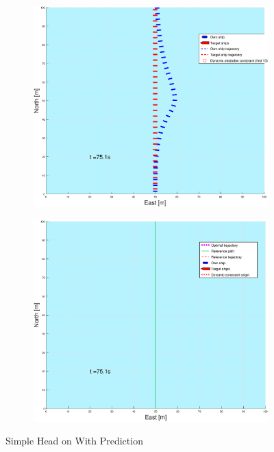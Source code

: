 \begin{figure}[ht]
\begin{subfigure}[b]{0.499\textwidth}
    \end{subfigure}
    \hfill
    \\
    \begin{subfigure}[b]{0.49\textwidth}
        \centering
        \includegraphics[width=\textwidth]{Images/Figures/enkel_HO/_Simple_0fig1_time=75}
    \end{subfigure}
    \hfill
    \begin{subfigure}[b]{0.499\textwidth}
        \centering
        \includegraphics[width=\textwidth]{Images/Figures/enkel_HO/_Simple_0fig999_time=75}
    \end{subfigure}
    \hfill
    \caption{Simple Head on With Prediction}
\end{figure}

